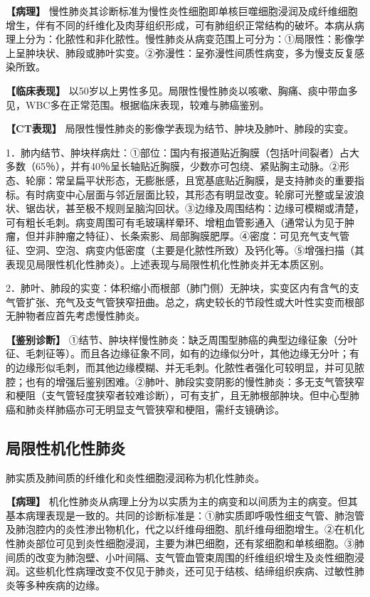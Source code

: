 \textbf{【病理】}
慢性肺炎其诊断标准为慢性炎性细胞即单核巨噬细胞浸润及成纤维细胞增生，伴有不同的纤维化及肉芽组织形成，可有肺组织正常结构的破坏。本病从病理上分为：化脓性和非化脓性。慢性肺炎从病变范围上可分为：①局限性：影像学上呈肿块状、肺段或肺叶实变。②弥漫性：呈弥漫性间质性病变，多为慢支反复感染所致。

\textbf{【临床表现】}
以50岁以上男性多见。局限性慢性肺炎以咳嗽、胸痛、痰中带血多见，WBC多在正常范围。根据临床表现，较难与肺癌鉴别。

\textbf{【CT表现】}
局限性慢性肺炎的影像学表现为结节、肿块及肺叶、肺段的实变。

1．肺内结节、肿块样病灶：①部位：国内有报道贴近胸膜（包括叶间裂者）占大多数（65％），并有40％呈长轴贴近胸膜，少数亦可包绕、紧贴胸主动脉。②形态、轮廓：常呈扁平状形态，无膨胀感，且宽基底贴近胸膜，是支持肺炎的重要指标。有时病变中心层面与邻近层面比较，其形态有明显改变。轮廓可光整或呈波浪状、锯齿状，甚至极不规则呈脑沟回状。③边缘及周围结构：边缘可模糊或清楚，可有粗长毛刺。病变周围可有毛玻璃样晕环、增粗血管影通入（通常认为见于肿瘤，但并非肿瘤之特征）、长条索影、局部胸膜肥厚。④密度：可见充气支气管征、空洞、空泡、病变内低密度（主要是化脓性所致）及钙化等。⑤增强扫描（其表现见局限性机化性肺炎）。上述表现与局限性机化性肺炎并无本质区别。

2．肺叶、肺段的实变：体积缩小而根部（肺门侧）无肿块，实变区内有含气的支气管扩张、充气及支气管狭窄扭曲。总之，病史较长的节段性或大叶性实变而根部无肿物者应首先考虑慢性肺炎。

\textbf{【鉴别诊断】}
①结节、肿块样慢性肺炎：缺乏周围型肺癌的典型边缘征象（分叶征、毛刺征等）。而且各边缘征象不同，如有的边缘似分叶，其他边缘无分叶；有的边缘形似毛刺，而其他边缘模糊、并无毛刺。化脓性者强化可较明显，并可见脓腔；也有的增强后鉴别困难。②肺叶、肺段实变阴影的慢性肺炎：多无支气管狭窄和梗阻（支气管轻度狭窄者较难诊断），可有支扩，且无肺根部肿块。但中心型肺癌和肺炎样肺癌亦可无明显支气管狭窄和梗阻，需纤支镜确诊。

\subsection{局限性机化性肺炎}

肺实质及肺间质的纤维化和炎性细胞浸润称为机化性肺炎。

\textbf{【病理】}
机化性肺炎从病理上分为以实质为主的病变和以间质为主的病变。但其基本病理表现是一致的。共同的诊断标准是：①肺实质即呼吸性细支气管、肺泡管及肺泡腔内的炎性渗出物机化，代之以纤维母细胞、肌纤维母细胞增生。②在机化性肺炎部位可见到炎性细胞浸润，主要为淋巴细胞，还有浆细胞和单核细胞。③肺间质的改变为肺泡壁、小叶间隔、支气管血管束周围的纤维组织增生及炎性细胞浸润。这些机化性病理改变不仅见于肺炎，还可见于结核、结缔组织疾病、过敏性肺炎等多种疾病的边缘。

